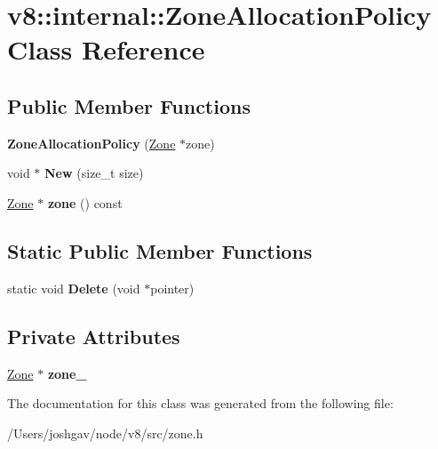 \hypertarget{classv8_1_1internal_1_1_zone_allocation_policy}{}\section{v8\+:\+:internal\+:\+:Zone\+Allocation\+Policy Class Reference}
\label{classv8_1_1internal_1_1_zone_allocation_policy}
\subsection*{Public Member Functions}
\begin{DoxyCompactItemize}
\item 
{\bfseries Zone\+Allocation\+Policy} (\hyperlink{classv8_1_1internal_1_1_zone}{Zone} $\ast$zone)\hypertarget{classv8_1_1internal_1_1_zone_allocation_policy_a37f5884ffaf08def2a33fc91947ae68f}{}\label{classv8_1_1internal_1_1_zone_allocation_policy_a37f5884ffaf08def2a33fc91947ae68f}

\item 
void $\ast$ {\bfseries New} (size\+\_\+t size)\hypertarget{classv8_1_1internal_1_1_zone_allocation_policy_a1e8b5efc63bbf48f81a6e774e9d96123}{}\label{classv8_1_1internal_1_1_zone_allocation_policy_a1e8b5efc63bbf48f81a6e774e9d96123}

\item 
\hyperlink{classv8_1_1internal_1_1_zone}{Zone} $\ast$ {\bfseries zone} () const \hypertarget{classv8_1_1internal_1_1_zone_allocation_policy_a81835b48ee36de293020dd040a166cfa}{}\label{classv8_1_1internal_1_1_zone_allocation_policy_a81835b48ee36de293020dd040a166cfa}

\end{DoxyCompactItemize}
\subsection*{Static Public Member Functions}
\begin{DoxyCompactItemize}
\item 
static void {\bfseries Delete} (void $\ast$pointer)\hypertarget{classv8_1_1internal_1_1_zone_allocation_policy_a9d9080d0d8ea07f8b043548d4645c7f8}{}\label{classv8_1_1internal_1_1_zone_allocation_policy_a9d9080d0d8ea07f8b043548d4645c7f8}

\end{DoxyCompactItemize}
\subsection*{Private Attributes}
\begin{DoxyCompactItemize}
\item 
\hyperlink{classv8_1_1internal_1_1_zone}{Zone} $\ast$ {\bfseries zone\+\_\+}\hypertarget{classv8_1_1internal_1_1_zone_allocation_policy_a4e543e2042b23d4d6ff9ff46398983a3}{}\label{classv8_1_1internal_1_1_zone_allocation_policy_a4e543e2042b23d4d6ff9ff46398983a3}

\end{DoxyCompactItemize}


The documentation for this class was generated from the following file\+:\begin{DoxyCompactItemize}
\item 
/\+Users/joshgav/node/v8/src/zone.\+h\end{DoxyCompactItemize}
